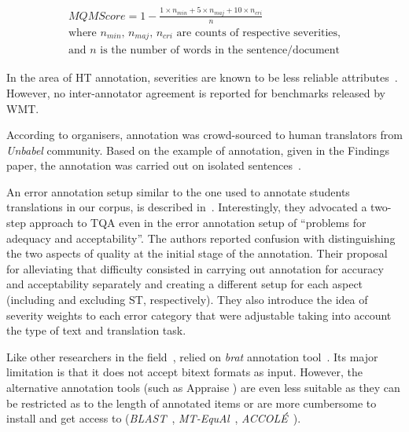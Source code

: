 \begin{equation}\label{eq:mqm_score}
\begin{split}
MQM Score = 1 - \frac{1\times n_{min} + 5\times n_{maj} + 10\times n_{cri}}{n} \\
\text{where $n_{min}$, $n_{maj}$, $n_{cri}$ are counts of respective severities,} \\
\text{and $n$ is the number of words in the sentence/document}
\end{split}
\end{equation}

In the area of HT annotation, severities are known to be less reliable attributes~\cite[p.33]{HuertasBarros2018}. However, no inter-annotator agreement is reported for benchmarks released by WMT.

According to organisers, annotation was crowd-sourced to human translators from \textit{Unbabel} community. Based on the example of annotation, given in the Findings paper, the annotation was carried out on isolated sentences~\cite[p.3]{Fonseca2019}. 

An error annotation setup similar to the one used to annotate students translations in our corpus, is described in~\citet{Daems2013, Daems2017}. Interestingly, they advocated a two-step approach to \gls*{TQA} even in the error annotation setup of ``problems for adequacy and acceptability''. The authors reported confusion with distinguishing the two aspects of quality at the initial stage of the annotation. Their proposal for alleviating that difficulty consisted in carrying out annotation for accuracy and acceptability separately and creating a different setup for each aspect (including and excluding ST, respectively). 
They also introduce the idea of severity weights to each error category that were adjustable taking into account the type of text and translation task.

Like other researchers in the field~\cite{Kubler2018,Verplaetse2019}, \citet{Daems2017} relied on \textit{brat} annotation tool~\cite{Stenetorp2012}. Its major limitation is that it does not accept bitext formats as input. 
However, the alternative annotation tools (such as Appraise \cite{Federmann2010}) are even less suitable as they can be restricted as to the length of annotated items or are more cumbersome to install and get access to (\textit{BLAST}~\cite{Stymne2011}, \textit{MT-EquAl}~\cite{Girardi2014}, \textit{ACCOL\'E}~\cite{EsperancaRodier2019}).

